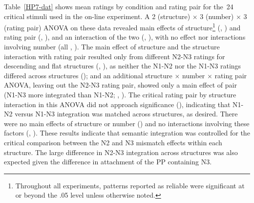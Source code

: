 \documentclass[12pt,titlepage]{article}
\newcommand{\insertnote}[1]{%
\vspace{\baselineskip}
\noindent
\begin{minipage}{\textwidth}
\begin{center}
========================= \\
Insert #1 About Here \\
========================= \\
\end{center}
\vspace{.8\baselineskip}
\end{minipage}}
\newcommand{\IGNORE}[1]{} %
\newcommand{\showp}[1]{\IGNORE{#1}} %
\begin{document}
Table~\ref{HP7-dat} shows mean ratings by condition and rating pair for
the~24 critical stimuli used in the on-line experiment.  A 2 (structure)
$\times$ 3 (number) $\times$ 3 (rating pair) ANOVA on these data revealed
main effects of structure\footnote{Throughout all experiments, patterns
reported as reliable were significant at or beyond the .05 level unless
otherwise noted.} (, \showp{, \p{05}}) and
rating pair (, \showp{, \p{001}}), and an
interaction of the two (, \showp{, \p{01}}),
with no effect nor interactions involving number (all \Fsweak[1.6],
\psweak[20]).  The main effect of structure and the structure interaction
with rating pair resulted only from different N2-N3 ratings for descending
and flat structures (, \showp{, \p{001}}), as
neither the N1-N2 nor the N1-N3 ratings differed across structures
(\Fsweak); and an additional structure $\times$ number $\times$ rating pair
ANOVA, leaving out the N2-N3 rating pair, showed only a main effect of pair
(N1-N3 more integrated than N1-N2; , \showp{,
\p{01}}).  The critical rating pair by structure interaction in this ANOVA
did not approach significance (\Fweak), indicating that N1-N2 versus N1-N3
integration was matched across structures, as desired.  There were no main
effects of structure or number (\Fsweak) and no interactions involving
these factors (\Fsweak[1.3], \psweak[30]).  These results indicate that
semantic integration was controlled for the critical comparison between the
N2 and N3 mismatch effects within each structure.  The large difference in
N2-N3 integration across structures was also expected given the difference
in attachment of the PP containing N3.

\end{document}
